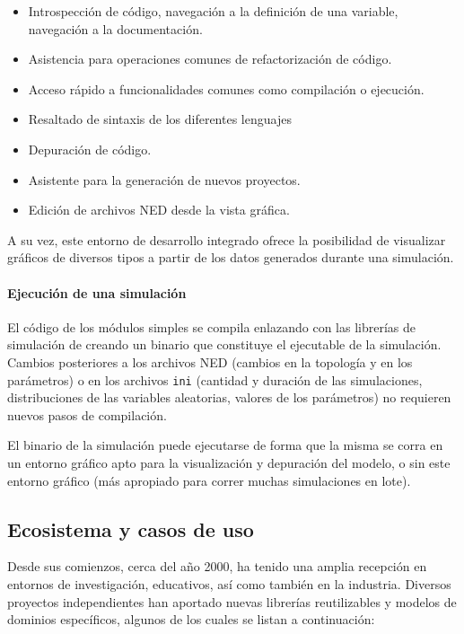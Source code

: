 \begin{itemize}
    \item Introspección de código, navegación a la definición de una variable,
navegación a la documentación.

    \item Asistencia para operaciones comunes de refactorización de código.

    \item Acceso rápido a funcionalidades comunes como compilación o ejecución.

    \item Resaltado de sintaxis de los diferentes lenguajes

    \item Depuración de código.

    \item Asistente para la generación de nuevos proyectos.

    \item Edición de archivos NED desde la vista gráfica.
\end{itemize}

A su vez, este entorno de desarrollo integrado ofrece la posibilidad de
visualizar gráficos de diversos tipos a partir de los datos generados durante
una simulación.

\paragraph{Ejecución de una simulación}

El código de los módulos simples se compila enlazando con las librerías de
simulación de \omnetpp{} creando un binario que constituye el ejecutable de la
simulación. Cambios posteriores a los archivos NED (cambios en la topología y
en los parámetros) o en los archivos \verb!ini! (cantidad y duración de las
simulaciones, distribuciones de las variables aleatorias, valores de los
parámetros) no requieren nuevos pasos de compilación.

El binario de la simulación puede ejecutarse de forma que la misma se
corra en un entorno gráfico apto para la visualización y depuración del modelo,
o sin este entorno gráfico (más apropiado para correr muchas simulaciones en
lote).

\subsection{Ecosistema y casos de uso}

Desde sus comienzos, cerca del año 2000, \omnetpp{} ha tenido una amplia recepción
en entornos de investigación, educativos, así como también en la industria.
Diversos proyectos independientes han aportado nuevas librerías reutilizables y
modelos de dominios específicos, algunos de los cuales se listan a
continuación:

